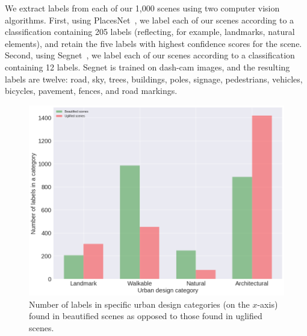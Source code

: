 We extract labels from each of our 1,000 scenes using two computer vision algorithms. First, using PlacesNet~\cite{zhou2014learning}, we label each of our scenes according to a classification containing 205 labels (reflecting, for example, landmarks, natural elements), and retain the five labels with highest confidence scores for the scene. Second, using Segnet~\cite{badrinarayanan2015segnet}, we  label each of our scenes according to a classification containing 12 labels. Segnet is trained on dash-cam images, and the resulting labels are twelve: road, sky, trees,  buildings, poles, signage, pedestrians, vehicles, bicycles, pavement, fences, and road markings. 

\begin{figure}[h]
	\centering
	\includegraphics[width=\columnwidth]{Plot/taxonomyCount.png}
	\caption{Number of labels in specific urban design categories (on the $x$-axis) found in beautified scenes as opposed to those found in uglified scenes.}
	\label{fig:taxonomyCount}
\end{figure}


